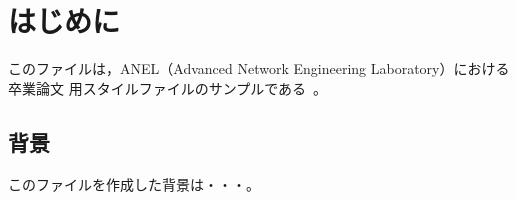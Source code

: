 \chapter{はじめに}

このファイルは，ANEL（Advanced Network Engineering Laboratory）における卒業論文
用スタイルファイルのサンプルである~\cite{sato19hoge-TPT}。

 \section{背景}

 このファイルを作成した背景は・・・。


